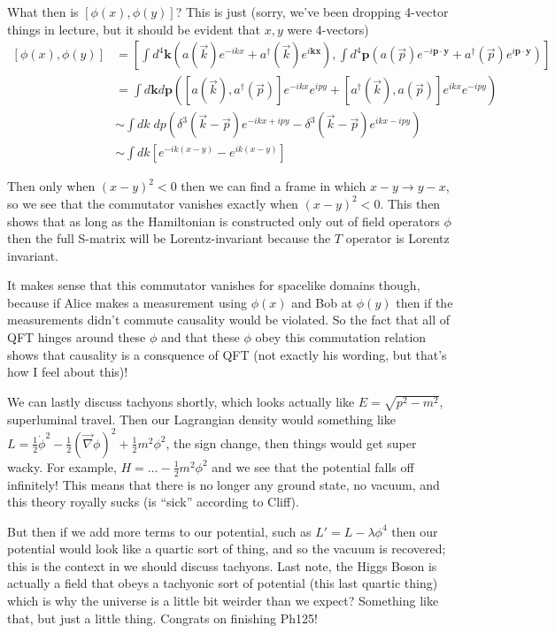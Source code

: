 \documentclass[10pt]{report}
\begin{document}
What then is $\left[ \phi(x), \phi(y) \right]$? This is just (sorry, we've been dropping 4-vector things in lecture, but it should be evident that $x,y$ were 4-vectors)
\begin{align}
    \left[ \phi(x), \phi(y) \right] &= \left[ \int d^4\mathbf{k}\left( a(\vec{k})e^{-ikx} + a^\dagger(\vec{k})e^{i\mathbf{k}\mathbf{x}} \right), \int d^4\mathbf{p}\left( a(\vec{p})e^{-i\mathbf{p} \cdot \mathbf{y}} + a^\dagger(\vec{p})e^{i\mathbf{p} \cdot\mathbf{y}} \right) \right]\\
    &= \int d\mathbf{k} d\mathbf{p}\left( \left[ a(\vec{k}), a^\dagger(\vec{p}) \right]e^{-ikx}e^{ipy} + \left[ a^\dagger(\vec{k}),a(\vec{p}) \right]e^{ikx}e^{-ipy} \right)\\
    &\sim \int dk\; dp\left( \delta^3(\vec{k} - \vec{p})e^{-ikx + ipy} - \delta^3(\vec{k} - \vec{p}) e^{ikx - ipy} \right)\\
    &\sim \int dk\left[ e^{-ik\left( x-y \right)} - e^{ik\left( x-y \right)} \right]
\end{align}

Then only when $(x-y)^2 < 0$ then we can find a frame in which $x-y \to y-x$, so we see that the commutator vanishes exactly when $(x-y)^2 < 0$. This then shows that as long as the Hamiltonian is constructed only out of field operators $\phi$ then the full S-matrix will be Lorentz-invariant because the $T$ operator is Lorentz invariant.

It makes sense that this commutator vanishes for spacelike domains though, because if Alice makes a measurement using $\phi(x)$ and Bob at $\phi(y)$ then if the measurements didn't commute causality would be violated. So the fact that all of QFT hinges around these $\phi$ and that these $\phi$ obey this commutation relation shows that causality is a consquence of QFT (not exactly his wording, but that's how I feel about this)!

We can lastly discuss tachyons shortly, which looks actually like $E = \sqrt{p^2 - m^2}$, superluminal travel. Then our Lagrangian density would something like $L = \frac{1}{2}\dot{\phi}^2 - \frac{1}{2}(\vec{\nabla}\phi)^2 + \frac{1}{2}m^2\phi^2$, the sign change, then things would get super wacky. For example, $H = \dots - \frac{1}{2}m^2\phi^2$ and we see that the potential falls off infinitely! This means that there is no longer any ground state, no vacuum, and this theory royally sucks (is ``sick'' according to Cliff).

But then if we add more terms to our potential, such as $L' = L - \lambda \phi^4$ then our potential would look like a quartic sort of thing, and so the vacuum is recovered; this is the context in we should discuss tachyons. Last note, the Higgs Boson is actually a field that obeys a tachyonic sort of potential (this last quartic thing) which is why the universe is a little bit weirder than we expect? Something like that, but just a little thing. Congrats on finishing Ph125!
\end{document}
